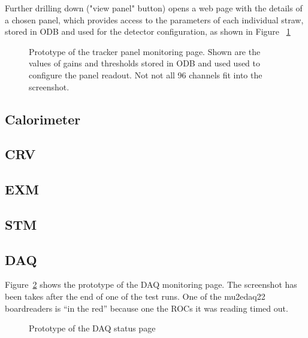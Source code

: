 Further drilling down ("view panel" button) opens a web page with the details 
of a chosen panel, which provides access to the parameters of each individual
straw, stored in ODB and used for the detector configuration,
as shown in Figure ~\ref{figure:monitoring_panel_view}

\begin{figure}[H]
  \caption{
    \label{figure:monitoring_panel_view}
    Prototype of the tracker panel monitoring page. Shown are the values of gains and thresholds
    stored in ODB and used used to configure the panel readout.
    Not not all 96 channels fit into the screenshot.
  }
\end{figure}

\subsection{Calorimeter}
\subsection{CRV}
\subsection{EXM}
\subsection{STM}
\subsection{DAQ}

Figure~\ref{figure:daq_status} shows the prototype of the DAQ monitoring page.
The screenshot has been takes after the end of one of the test runs.
One of the mu2edaq22 boardreaders is ``in the red'' because one the ROCs it
was reading timed out.

\begin{figure}[H]
  \caption{
    \label{figure:daq_status}
    Prototype of the DAQ status page
  }
\end{figure}

